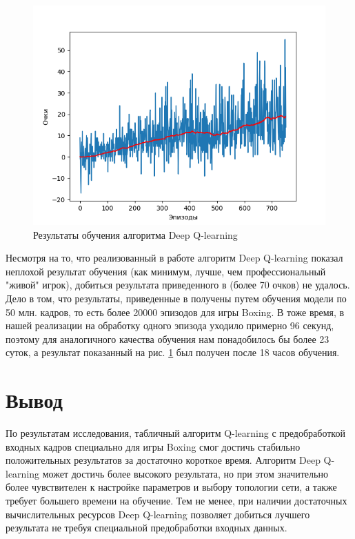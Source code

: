 \documentclass{letask}
\begin{document}
\begin{figure}[h]
\centering
\includegraphics[scale=0.6]{deep_q_learning_graph.png}
\caption{Результаты обучения алгоритма Deep Q-learning}
\label{deep_q_learning_graph}
\end{figure}

Несмотря на то, что реализованный в работе алгоритм Deep Q-learning показал неплохой результат обучения (как минимум, лучше, чем профессиональный "живой" игрок), добиться результата приведенного в \cite{Mnih} (более 70 очков) не удалось. Дело в том, что результаты, приведенные в \cite{Mnih} получены путем обучения модели по 50 млн. кадров, то есть более 20000 эпизодов для игры Boxing. В тоже время, в нашей реализации на обработку одного эпизода уходило примерно 96 секунд, поэтому для аналогичного качества обучения нам понадобилось бы более 23 суток, а результат показанный на рис. \ref{deep_q_learning_graph} был получен после 18 часов обучения.


\section{Вывод}
По результатам исследования, табличный алгоритм Q-learning с предобработкой входных кадров специально для игры Boxing смог достичь стабильно положительных результатов за достаточно короткое время. Алгоритм Deep Q-learning может достичь более высокого результата, но при этом значительно более чувствителен к настройке параметров и выбору топологии сети, а также требует большего времени на обучение. Тем не менее, при наличии достаточных вычислительных ресурсов Deep Q-learning позволяет добиться лучшего результата не требуя специальной предобработки входных данных.
\end{document}
